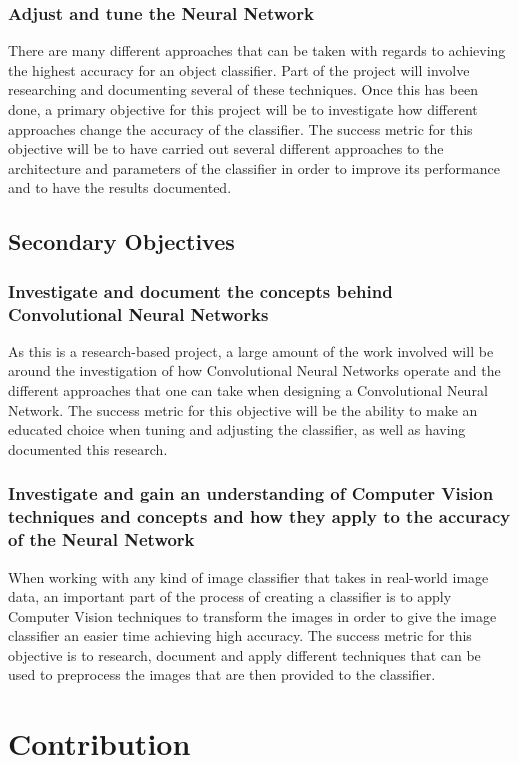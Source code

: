 \documentclass[12pt]{report}
\begin{document}
\subsubsection{Adjust and tune the Neural Network}
There are many different approaches that can be taken with regards to achieving the highest accuracy for an object classifier. Part of the project will involve researching and documenting several of these techniques. Once this has been done, a primary objective for this project will be to investigate how different approaches change the accuracy of the classifier. The success metric for this objective will be to have carried out several different approaches to the architecture and parameters of the classifier in order to improve its performance and to have the results documented.
\vspace{0.5cm}
\subsection{Secondary Objectives}
\subsubsection{Investigate and document the concepts behind Convolutional Neural Networks}
As this is a research-based project, a large amount of the work involved will be around the investigation of how Convolutional Neural Networks operate and the different approaches that one can take when designing a Convolutional Neural Network. The success metric for this objective will be the ability to make an educated choice when tuning and adjusting the classifier, as well as having documented this research.
\subsubsection{Investigate and gain an understanding of Computer Vision techniques and concepts and how they apply to the accuracy of the Neural Network}
When working with any kind of image classifier that takes in real-world image data, an important part of the process of creating a classifier is to apply Computer Vision techniques to transform the images in order to give the image classifier an easier time achieving high accuracy. The success metric for this objective is to research, document and apply different techniques that can be used to preprocess the images that are then provided to the classifier.
\section{Contribution}
\end{document}
